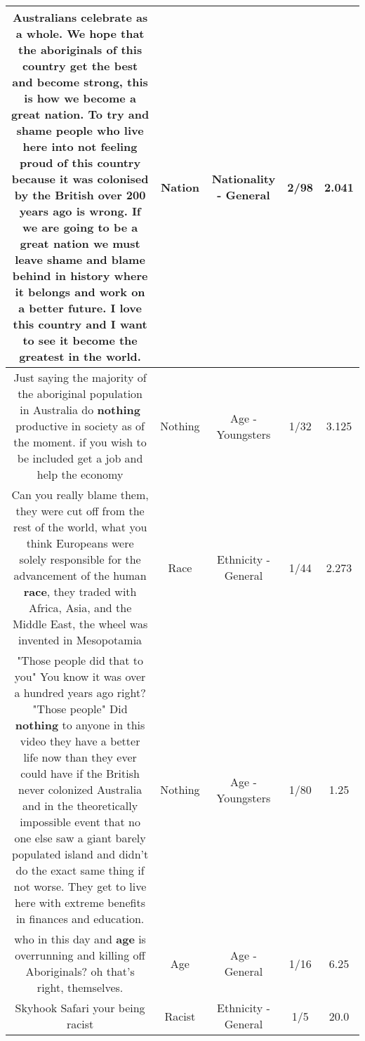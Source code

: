 \documentclass[11pt]{article}
\newlength\mylength
\begin{document}
\begin{center}
\begin{longtable}{|C{.65\mylength}|C{.30\mylength}|C{.12\mylength}|C{.12\mylength}|C{.12\mylength}|}
  \small Australians celebrate as a whole. We hope that the aboriginals of this country get the best and become strong, this is how we become a great \textbf{nation}. To try and shame people who live here into not feeling proud of this country because it was colonised by the British over 200 years ago is wrong. If we are going to be a great \textbf{nation} we must leave shame and blame behind in history where it belongs and work on a better future. I love this country and I want to see it become the greatest in the world.\normalsize   & Nation & Nationality - General & 2/98 & 2.041 \\  \hline
  \small Just saying the majority of the aboriginal population in Australia do \textbf{nothing} productive in society as of the moment. if you wish to be included  get a job and help the economy\normalsize   & Nothing & Age - Youngsters & 1/32 & 3.125 \\  \hline
  \small Can you really blame them, they were cut off from the rest of the world, what you think Europeans were solely responsible for the advancement of the human \textbf{race}, they traded with Africa, Asia, and the Middle East, the wheel was invented in Mesopotamia\normalsize   & Race & Ethnicity - General & 1/44 & 2.273 \\  \hline
  \small "Those people did that to you" You know it was over a hundred years ago right? "Those people" Did \textbf{nothing} to anyone in this video they have a better life now than they ever could have if the British never colonized Australia and in the theoretically impossible event that no one else saw a giant barely populated island and didn't do the exact same thing if not worse. They get to live here with extreme benefits in finances and education.\normalsize   & Nothing & Age - Youngsters & 1/80 & 1.25 \\  \hline
  \small who in this day and \textbf{age} is overrunning and killing off Aboriginals? oh that's right, themselves.\normalsize   & Age & Age - General & 1/16 & 6.25 \\  \hline
  \small Skyhook Safari your being racist\normalsize   & Racist & Ethnicity - General & 1/5 & 20.0 \\  \hline

\end{longtable}
\end{center}
\end{document}
